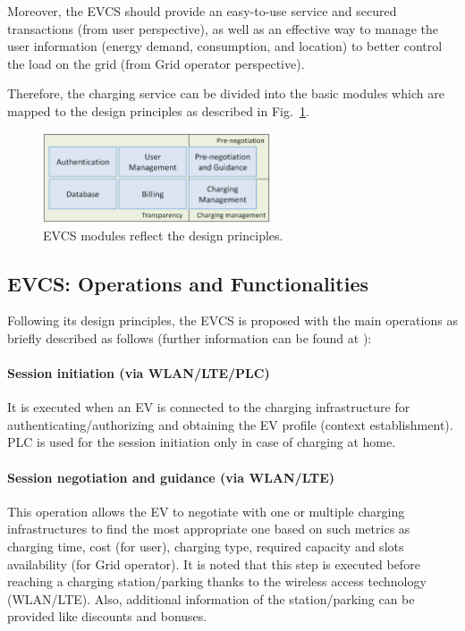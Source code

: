 Moreover, the EVCS should provide an easy-to-use service and secured transactions (from user perspective), as well as an effective way to manage the user information (energy demand, consumption, and location) to better control the load on the grid (from Grid operator perspective).

Therefore, the charging service can be divided into the basic modules which are mapped to the design principles as described in Fig.~\ref{fig:modules}.
\begin{figure}[h!] 
 \begin{center} 
\includegraphics[width=0.6\textwidth]{./Part2/Chapter6/figures/modules.eps} 
   \caption[The EVCS's modules.]{EVCS modules reflect the design principles.}
   \label{fig:modules}
 \end{center} 
\end{figure} 
\subsection{EVCS: Operations and Functionalities}
Following its design principles, the EVCS is proposed with the main operations as briefly described as follows (further information can be found at \cite{velcri_report}):
\paragraph{Session initiation (via WLAN/LTE/PLC)} It is executed when an EV is connected to the charging infrastructure for authenticating/authorizing and obtaining the EV profile (context establishment). PLC is used for the session initiation only in case of charging at home. 
\paragraph{Session negotiation and guidance (via WLAN/LTE)} This operation allows the EV to negotiate with one or multiple charging infrastructures to find the most appropriate one based on such metrics as charging time, cost (for user), charging type, required capacity and slots availability (for Grid operator). It is noted that this step is executed before reaching a charging station/parking thanks to the wireless access technology (WLAN/LTE). Also, additional information of the station/parking can be provided like discounts and bonuses.
